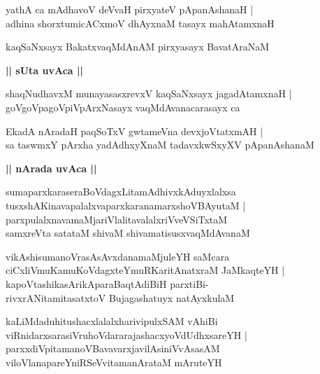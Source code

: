 \documentclass[twoside,12pt,openright]{book}
\newcounter{shloka}[chapter]
\def\uvaca#1{\centerline{{\large\textbf{#1}}}}
\begin{document}
\begin{shloka}%
yathA ca mAdhavoV deVvaH pirxyateV pApanAshanaH |\\
adhina shorxtumicACxmoV dhAyxnaM tasayx mahAtamxnaH 
\end{shloka}

\begin{shloka}%
kaqSaNxsayx BakatxvaqMdAnAM pirxyasayx BavatAraNaM \\
\end{shloka}

\uvaca{|| sUta uvAca ||}

\begin{shloka}%
shaqNudhavxM munayasasxrevxV kaqSaNxsayx jagadAtamxnaH |\\
goVgoVpagoVpiVpArxNasayx vaqMdAvanacarasayx ca 
\end{shloka}

\begin{shloka}%
EkadA nAradaH paqSoTxV gwtameVna devxjoVtatxmAH |\\
sa taswmxY pArxha yadAdhxyXnaM tadavxkwSxyXV pApanAshanaM 
\end{shloka}

\uvaca{|| nArada uvAca ||}

\begin{shloka}%
sumaparxkaraseraBoVdagxLitamAdhivxkAduyxlalxsa \\
tusxshAKinavapalalxvaparxkaranamarxshoVBAyutaM |\\
parxpulalxnavamaMjariVlalitavalalxriVveVSiTxtaM \\
samxreVta satataM shivaM shivamatisusxvaqMdAvanaM 
\end{shloka}

\begin{shloka}%
vikAshisumanoVrasAsAvxdanamaMjuleYH saMcara \\
ciCxliVmuKamuKoVdagxteYmuRKaritAnatxraM JaMkaqteYH |\\
kapoVtashikasArikAparaBaqtAdiBiH parxtiBi-\\
rivxrANitamitasatxtoV Bujagashatuyx natAyxkulaM 
\end{shloka}

\begin{shloka}%
kaLiMdaduhitushacxlalalxharivipulxSAM vAhiBi \\
viRnidarxsarasiVruhoVdararajashacxyoVdUdhxsareYH |\\
parxxdiVpitamanoVBavavarxjavilAsiniVvAsasAM \\
viloVlanapareYniRSeVvitamanArataM mAruteYH 
\end{shloka}
\end{document}
